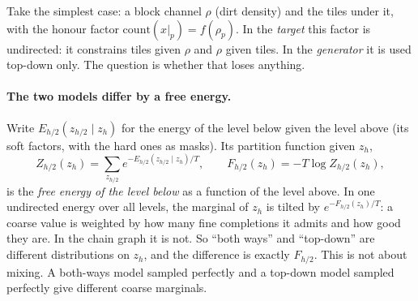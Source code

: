 \documentclass[11pt]{article}
\newcommand{\1}{\mathds{1}}
\begin{document}
Take the simplest case: a block channel $\rho$ (dirt density) and the tiles
under it, with the honour factor $\mathrm{count}(x|_p) = f(\rho_p)$. In the
\emph{target} this factor is undirected: it constrains tiles given $\rho$ and
$\rho$ given tiles. In the \emph{generator} it is used top-down only. The
question is whether that loses anything.

\paragraph{The two models differ by a free energy.} Write $E_{h/2}(z_{h/2} \mid z_h)$
for the energy of the level below given the level above (its soft factors,
with the hard ones as masks). Its partition function given $z_h$,
\[
  Z_{h/2}(z_h) = \sum_{z_{h/2}} e^{-E_{h/2}(z_{h/2} \mid z_h)/T},
  \qquad
  F_{h/2}(z_h) = -T \log Z_{h/2}(z_h),
\]
is the \emph{free energy of the level below} as a function of the level above.
In one undirected energy over all levels, the marginal of $z_h$ is tilted by
$e^{-F_{h/2}(z_h)/T}$: a coarse value is weighted by how many fine
completions it admits and how good they are. In the chain graph it is not.
So ``both ways'' and ``top-down'' are different distributions on $z_h$, and the
difference is exactly $F_{h/2}$. This is not about mixing. A both-ways model
sampled perfectly and a top-down model sampled perfectly give different
coarse marginals.
\end{document}
